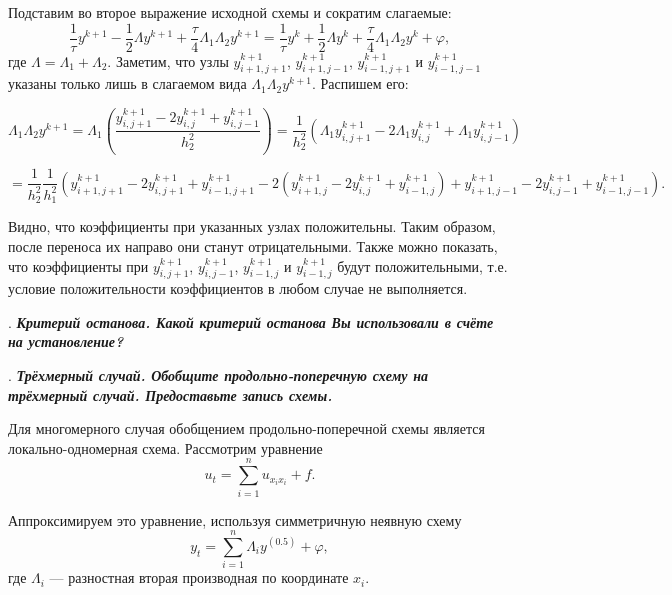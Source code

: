 \documentclass[12pt, a4paper]{article}
\newcounter{mycounter}
\newcommand{\quastion}[1]{%
	\stepcounter{mycounter}%
	\textbf{\themycounter}.  %
	\textbf{\textit{#1}}
	
}
\begin{document}
	Подставим во второе выражение исходной схемы и сократим слагаемые:
	\begin{equation*}
		\frac{1}{\tau} y^{k+1} - \frac{1}{2} \Lambda y^{k+1} + \frac{\tau}{4} \Lambda_1 \Lambda_2 y^{k+1} = \frac{1}{\tau} y^k + \frac{1}{2} \Lambda y^k + \frac{\tau}{4} \Lambda_1 \Lambda_2 y^k + \varphi,
	\end{equation*}
	где $\Lambda = \Lambda_1 + \Lambda_2$. Заметим, что узлы $y^{k+1}_{i+1,j+1}$, $y^{k+1}_{i+1,j-1}$, $y^{k+1}_{i-1,j+1}$ и $y^{k+1}_{i-1,j-1}$ указаны только лишь в слагаемом вида $\Lambda_1 \Lambda_2 y^{k+1}$. Распишем его:
	
	\begin{equation*}
		\Lambda_1 \Lambda_2 y^{k+1} = \Lambda_1 \left(\frac{y^{k+1}_{i,j+1} - 2y^{k+1}_{i,j} + y^{k+1}_{i,j-1}}{h_2^2}\right) = \frac{1}{h_2^2} \left(\Lambda_1 y^{k+1}_{i,j+1} - 2\Lambda_1 y^{k+1}_{i,j} + \Lambda_1 y^{k+1}_{i,j-1}\right)
	\end{equation*}
	
	\begin{equation*}
		= \frac{1}{h_2^2} \frac{1}{h_1^2} \left( y^{k+1}_{i+1,j+1} - 2y^{k+1}_{i,j+1} + y^{k+1}_{i-1,j+1} - 2(y^{k+1}_{i+1,j} - 2y^{k+1}_{i,j} + y^{k+1}_{i-1,j}) + y^{k+1}_{i+1,j-1} - 2y^{k+1}_{i,j-1} + y^{k+1}_{i-1,j-1} \right).
	\end{equation*}
	
	Видно, что коэффициенты при указанных узлах положительны. Таким образом, после переноса их направо они станут отрицательными. Также можно показать, что коэффициенты при $y^{k+1}_{i,j+1}$, $y^{k+1}_{i,j-1}$, $y^{k+1}_{i-1,j}$ и $y^{k+1}_{i-1,j}$ будут положительными, т.е. условие положительности коэффициентов в любом случае не выполняется.
	
	
	\bigskip
	\quastion{Критерий останова. Какой критерий останова Вы использовали в счёте на установление?}
	
	
	
	\quastion{ Трёхмерный случай. Обобщите продольно-поперечную схему на трёхмерный случай. Предоставьте запись схемы.}
	Для многомерного случая обобщением продольно-поперечной схемы является локально-одномерная схема. Рассмотрим уравнение
	\begin{equation*}
		u_t = \sum_{i=1}^n u_{x_i x_i} + f.
	\end{equation*}
	
	Аппроксимируем это уравнение, используя симметричную неявную схему
	\begin{equation*}
		y_t = \sum_{i=1}^n \Lambda_i y^{(0.5)} + \varphi,
	\end{equation*}
	где $\Lambda_i$ — разностная вторая производная по координате $x_i$.
	
\end{document}

